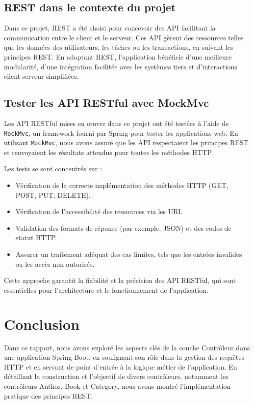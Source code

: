 \documentclass[a4paper,12pt]{article}
\begin{document}
\subsection{REST dans le contexte du projet}

Dans ce projet, REST a été choisi pour concevoir des API facilitant la communication entre le client et le serveur. Ces API gèrent des ressources telles que les données des utilisateurs, les tâches ou les transactions, en suivant les principes REST. En adoptant REST, l'application bénéficie d'une meilleure modularité, d'une intégration facilitée avec les systèmes tiers et d'interactions client-serveur simplifiées.

\subsection{Tester les API RESTful avec MockMvc}

Les API RESTful mises en œuvre dans ce projet ont été testées à l'aide de \texttt{MockMvc}, un framework fourni par Spring pour tester les applications web. En utilisant \texttt{MockMvc}, nous avons assuré que les API respectaient les principes REST et renvoyaient les résultats attendus pour toutes les méthodes HTTP.

Les tests se sont concentrés sur :
\begin{itemize}
    \item Vérification de la correcte implémentation des méthodes HTTP (GET, POST, PUT, DELETE).
    \item Vérification de l'accessibilité des ressources via les URI.
    \item Validation des formats de réponse (par exemple, JSON) et des codes de statut HTTP.
    \item Assurer un traitement adéquat des cas limites, tels que les entrées invalides ou les accès non autorisés.
\end{itemize}

Cette approche garantit la fiabilité et la précision des API RESTful, qui sont essentielles pour l'architecture et le fonctionnement de l'application.

\section{Conclusion}
Dans ce rapport, nous avons exploré les aspects clés de la couche Contrôleur dans une application Spring Boot, en soulignant son rôle dans la gestion des requêtes HTTP et en servant de point d'entrée à la logique métier de l'application. En détaillant la construction et l'objectif de divers contrôleurs, notamment les contrôleurs Author, Book et Category, nous avons montré l'implémentation pratique des principes REST.
\end{document}
